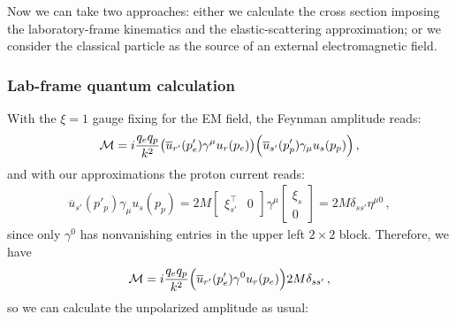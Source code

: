 \documentclass[main.tex]{subfiles}
\begin{document}
Now we can take two approaches: either we calculate the cross section imposing the laboratory-frame kinematics and the elastic-scattering approximation; or we consider the classical particle as the source of an external electromagnetic field. 

\subsubsection{Lab-frame quantum calculation}

With the \(\xi = 1 \) gauge fixing for the EM field, the Feynman amplitude reads: 
%
\begin{align}
\mathcal{M} = i \frac{q_e q_p}{k^2} 
\qty(\overline{u}_{r'} (p'_e) \gamma^{\mu } u_r (p_e))
\qty(\overline{u}_{s'} (p'_p) \gamma_{\mu } u_s (p_p))
\,,
\end{align}
%
and with our approximations the proton current reads: 
%
\begin{align}
\overline{u}_{s'} (p'_p) \gamma_{\mu } u_s (p_p)
= 2 M \left[\begin{array}{cc}
\xi ^{\top}_{s'} & 0
\end{array}\right]
\gamma^{\mu } 
\left[\begin{array}{c}
\xi_{s} \\ 
0
\end{array}\right]
= 2 M \delta_{s s'}
\eta^{\mu 0}
\,,
\end{align}
%
since only \(\gamma^{0}\) has nonvanishing entries in the upper left \(2 \times 2\) block. 
Therefore, we have 
%
\begin{align}
\mathcal{M} = i \frac{q_e q_p}{k^2} 
\qty(\overline{u}_{r'} (p'_e) \gamma^{0 } u_r (p_e))
2M \delta_{s s'}
\,,
\end{align}
%
so we can calculate the unpolarized amplitude as usual: 
%
\end{document}
